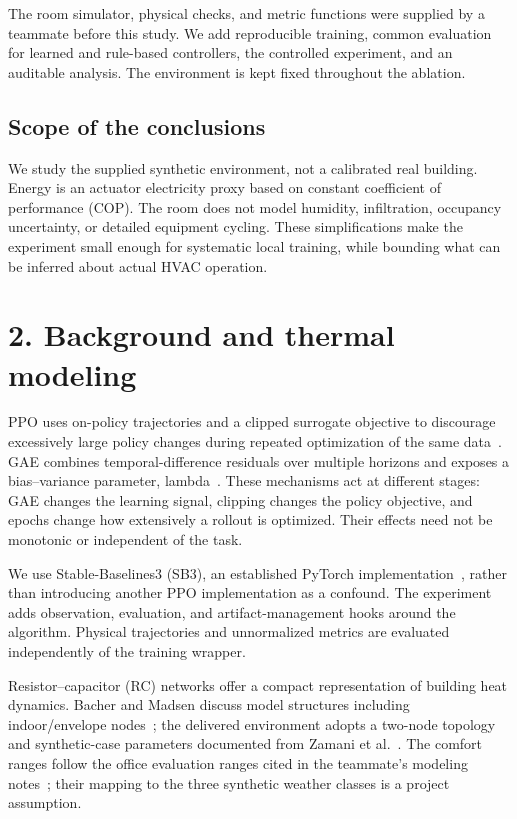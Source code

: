 \documentclass[10pt,a4paper]{article}
\begin{document}
The room simulator, physical checks, and metric functions were supplied by a teammate before this study. We add reproducible training, common evaluation for learned and rule-based controllers, the controlled experiment, and an auditable analysis. The environment is kept fixed throughout the ablation.

\subsection*{Scope of the conclusions}
We study the supplied synthetic environment, not a calibrated real building. Energy is an actuator electricity proxy based on constant coefficient of performance (COP). The room does not model humidity, infiltration, occupancy uncertainty, or detailed equipment cycling. These simplifications make the experiment small enough for systematic local training, while bounding what can be inferred about actual HVAC operation.
\clearpage

\section*{2. Background and thermal modeling}
PPO uses on-policy trajectories and a clipped surrogate objective to discourage excessively large policy changes during repeated optimization of the same data~\cite{ppo}. GAE combines temporal-difference residuals over multiple horizons and exposes a bias--variance parameter, lambda~\cite{gae}. These mechanisms act at different stages: GAE changes the learning signal, clipping changes the policy objective, and epochs change how extensively a rollout is optimized. Their effects need not be monotonic or independent of the task.

We use Stable-Baselines3 (SB3), an established PyTorch implementation~\cite{sb3}, rather than introducing another PPO implementation as a confound. The experiment adds observation, evaluation, and artifact-management hooks around the algorithm. Physical trajectories and unnormalized metrics are evaluated independently of the training wrapper.

Resistor--capacitor (RC) networks offer a compact representation of building heat dynamics. Bacher and Madsen discuss model structures including indoor/envelope nodes~\cite{bacher}; the delivered environment adopts a two-node topology and synthetic-case parameters documented from Zamani et al.~\cite{zamani}. The comfort ranges follow the office evaluation ranges cited in the teammate's modeling notes~\cite{hvacreview}; their mapping to the three synthetic weather classes is a project assumption.
\end{document}
